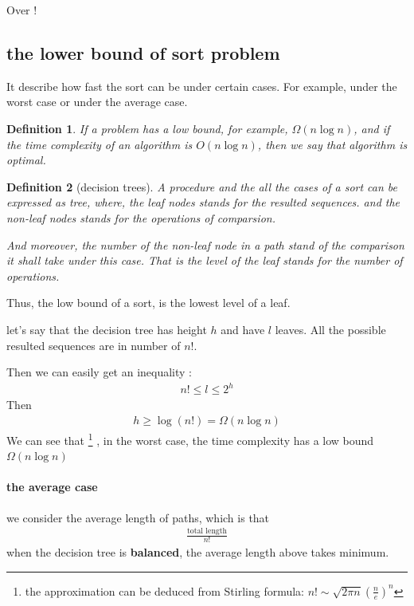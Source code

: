 \documentclass[a4paper, 10pt]{ctexart} %
\newtheorem{definition}{Definition}
\begin{document}
Over ! 

\subsection{the lower bound of sort problem}
It describe how fast the sort can be under certain cases.
For example, under the worst case or under the average case.

\begin{definition}
    If a problem has a low bound, for example, $\Omega\left( n\log n\right)$, 
    and if the time complexity of an algorithm is 
    $O \left( n\log n\right)$, 
    then we say that 
    algorithm is optimal.
\end{definition}
\begin{definition}[decision trees]
    A procedure and the all the cases of a sort can be expressed as tree,
    where, the leaf nodes stands for the resulted sequences.
    and the non-leaf nodes stands for the operations of comparsion.

    And moreover, the number of the non-leaf node in a path stand of the 
    comparison it shall take under this case. 
    That is the level of the leaf stands for the number of operations.
\end{definition}

Thus, the low bound of a sort, is the lowest level of a leaf. 


let's say that the decision tree has height $h$ and have $l$ leaves. All the possible resulted sequences are in number of 
$ n !$.

Then we can easily get an inequality :
\begin{align*}
      n ! \le l \le 2 ^{h}
\end{align*}
Then
\begin{align*}
h \ge \log \left( n !\right) = \Omega \left( n \log n\right)
\end{align*} 
We can see that
\footnote{the approximation can be deduced from Stirling formula: $n ! \sim \sqrt{2\pi n} \left( \frac{n}{e}\right) ^{n}$}
, in the worst case, the 
time complexity has a low bound $\Omega \left( n \log n \right)$

\paragraph{the average case} %
\label{par:the average case}
we consider the average length of paths, which is that 
\begin{align*}
    \frac{ \text{total length}}{n !}
\end{align*}
when the decision tree is \textbf{balanced}, the average length above takes minimum. 
\end{document}
